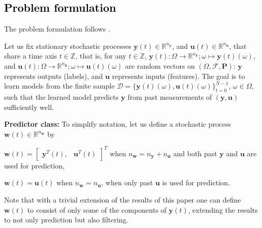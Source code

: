 \documentclass{article}
\newcommand{\train}{\mathcal{D}}
\def\rvu{{\mathbf{i}}}
\def\rvu{{\mathbf{u}}}
\def\rvy{{\mathbf{y}}}
\def\sR{{\mathbb{R}}}
\def\sZ{{\mathbb{Z}}}
\newcommand{\y}{\mathbf{y}}
\newcommand{\w}{\mathbf{w}}
\newcommand{\reals}{\mathbb{R}}
\newcommand{\bP}{\mathbf{P}}
\newcommand{\F}{\mathcal{F}}
\begin{document}
\subsection{\textcolor{black}{Problem formulation}}
The problem formulation follows \cite{eringis2023pacbayesRNN,eringis2023pacbayesian,eringisRenyi}.  
\par
Let us fix stationary stochastic processes $\y(t)\in \reals^{n_\y}$, and $\rvu(t)\in  \reals^{n_\rvu}$, that share a time axis $t\in\sZ$, that is, for any $t\in\sZ$, $\rvy(t):\Omega\to\sR^{n_\rvy};\omega\mapsto\rvy(t)(\omega)$, and $\rvu(t):\Omega\to\sR^{n_\rvu};\omega\mapsto\rvu(t)(\omega)$
are random vectors on $(\Omega,\F,\bP)$:
$\y$ represents outputs (labels), and $\rvu$ represents inputs (features).
The goal is to learn models from the finite sample $\train=\{\rvy(t)(\omega),\rvu(t)(\omega)\}_{t=0}^{N-1}$, $\omega \in \Omega$, such that the learned model
predicts  $\rvy$  from past measurements of $(\rvy,\rvu)$ sufficiently well.

\textbf{Predictor class:}
To simplify notation, let us define a stochastic process $\w(t)\in \sR^{n_\w}$ by %
\begin{description}
    \item $\w(t)=\begin{bmatrix} \y^T(t), & \rvu^T(t) \end{bmatrix}^T$ when $n_\w=n_\y+n_\rvu$ and both past $\y$ and $\rvu$ are used for prediction,
    \item $\w(t)=\rvu(t)$ when  $n_\w=n_\rvu$, when only past $\rvu$ is used for prediction.
\end{description}
Note that with a trivial extension of the results of this paper one can define $\w(t)$ to consist of only some of the components of $\y(t)$, extending the results to not only prediction but also filtering.
\end{document}
